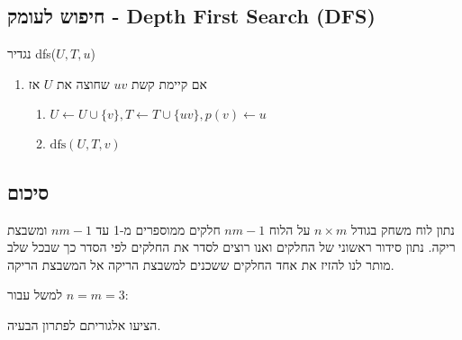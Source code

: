 \subsection*{%
חיפוש לעומק - 
\textenglish{Depth First Search (DFS)}
}
נגדיר
\textenglish{dfs($U, T, u$)}
\begin{enumerate}
\item
אם קיימת קשת 
$uv$
שחוצה את $U$ אז
	\begin{enumerate}
	\item
	$U \leftarrow U \cup \{v\}, T \leftarrow T \cup \{uv\}, p(v) \leftarrow u$
	\item
	$\text{dfs}(U, T, v)$
	\end{enumerate}
\end{enumerate}


\begin{center}
\end{center}

\subsection*{סיכום}
\begin{example}
נתון לוח משחק בגודל 
$n \times m$
על הלוח 
$nm - 1$
חלקים ממוספרים מ-1 עד 
$nm - 1$
ומשבצת ריקה.
נתון סידור ראשוני של החלקים ואנו רוצים לסדר את החלקים לפי הסדר 
כך שבכל שלב מותר לנו להזיז את אחד החלקים ששכנים למשבצת הריקה אל המשבצת הריקה.
\end{example}
למשל עבור
$n = m = 3$:
\begin{center}
\end{center}


הציעו אלגוריתם לפתרון הבעיה.
